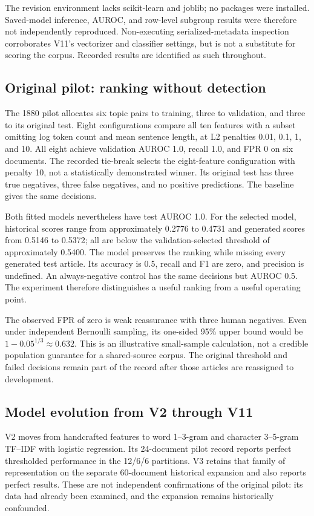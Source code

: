 \documentclass[11pt]{article}
\begin{document}
The revision environment lacks scikit-learn and joblib; no packages were
installed. Saved-model inference, AUROC, and row-level subgroup results were
therefore not independently reproduced. Non-executing serialized-metadata
inspection corroborates V11's vectorizer and classifier settings, but is
not a substitute for scoring the corpus. Recorded results are identified
as such throughout.

\subsection{Original pilot: ranking without detection}
The 1880 pilot allocates six topic pairs to training, three to validation,
and three to its original test. Eight configurations compare all ten
features with a subset omitting log token count and mean sentence length,
at L2 penalties 0.01, 0.1, 1, and 10. All eight achieve validation AUROC 1.0,
recall 1.0, and FPR 0 on six documents. The recorded tie-break selects the
eight-feature configuration with penalty 10, not a statistically demonstrated
winner. Its original test has three true negatives, three false negatives,
and no positive predictions. The baseline gives the same decisions.

Both fitted models nevertheless have test AUROC 1.0. For the selected model,
historical scores range from approximately 0.2776 to 0.4731 and generated
scores from 0.5146 to 0.5372; all are below the validation-selected threshold
of approximately 0.5400. The model preserves the ranking while missing every
generated test article. Its accuracy is 0.5, recall and F1 are zero, and
precision is undefined. An always-negative control has the same decisions
but AUROC 0.5. The experiment therefore distinguishes a useful ranking from
a useful operating point.

The observed FPR of zero is weak reassurance with three human negatives.
Even under independent Bernoulli sampling, its one-sided 95\% upper bound
would be $1-0.05^{1/3}\approx0.632$. This is an illustrative small-sample
calculation, not a credible population guarantee for a shared-source corpus.
The original threshold and failed decisions remain part of the record after
those articles are reassigned to development.

\subsection{Model evolution from V2 through V11}
V2 moves from handcrafted features to word 1--3-gram and character 3--5-gram
TF--IDF with logistic regression. Its 24-document pilot record reports
perfect thresholded performance in the 12/6/6 partitions. V3 retains that
family of representation on the separate 60-document historical expansion
and also reports perfect results. These are not independent confirmations
of the original pilot: its data had already been examined, and the expansion
remains historically confounded.
\end{document}
